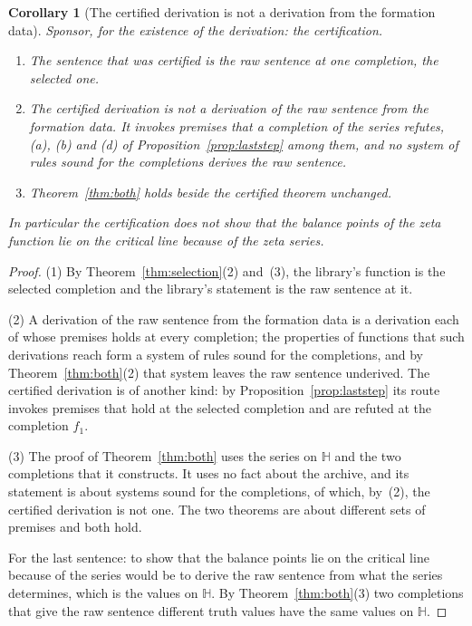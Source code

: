 \documentclass[11pt]{article}
\newtheorem{corollary}[theorem]{Corollary}
\theoremstyle{definition}
\theoremstyle{remark}
\newcommand{\Hp}{\mathbb H}
\begin{document}
\begin{corollary}[The certified derivation is not a derivation from the formation data]\label{cor:notfrom}
Sponsor, for the existence of the derivation: the certification.
\begin{enumerate}[leftmargin=2em,itemsep=1pt]
\item The sentence that was certified is the raw sentence at one completion, the selected one.
\item The certified derivation is not a derivation of the raw sentence from the formation data. It invokes premises that a completion of the series refutes, (a), (b) and (d) of Proposition~\ref{prop:laststep} among them, and no system of rules sound for the completions derives the raw sentence.
\item Theorem~\ref{thm:both} holds beside the certified theorem unchanged.
\end{enumerate}
In particular the certification does not show that the balance points of the zeta function lie on the critical line because of the zeta series.
\end{corollary}

\begin{proof}
(1) By Theorem~\ref{thm:selection}(2) and~(3), the library's function is the selected completion and the library's statement is the raw sentence at it.

(2) A derivation of the raw sentence from the formation data is a derivation each of whose premises holds at every completion; the properties of functions that such derivations reach form a system of rules sound for the completions, and by Theorem~\ref{thm:both}(2) that system leaves the raw sentence underived. The certified derivation is of another kind: by Proposition~\ref{prop:laststep} its route invokes premises that hold at the selected completion and are refuted at the completion $f_1$.

(3) The proof of Theorem~\ref{thm:both} uses the series on $\Hp$ and the two completions that it constructs. It uses no fact about the archive, and its statement is about systems sound for the completions, of which, by~(2), the certified derivation is not one. The two theorems are about different sets of premises and both hold.

For the last sentence: to show that the balance points lie on the critical line because of the series would be to derive the raw sentence from what the series determines, which is the values on $\Hp$. By Theorem~\ref{thm:both}(3) two completions that give the raw sentence different truth values have the same values on $\Hp$.
\end{proof}
\end{document}
